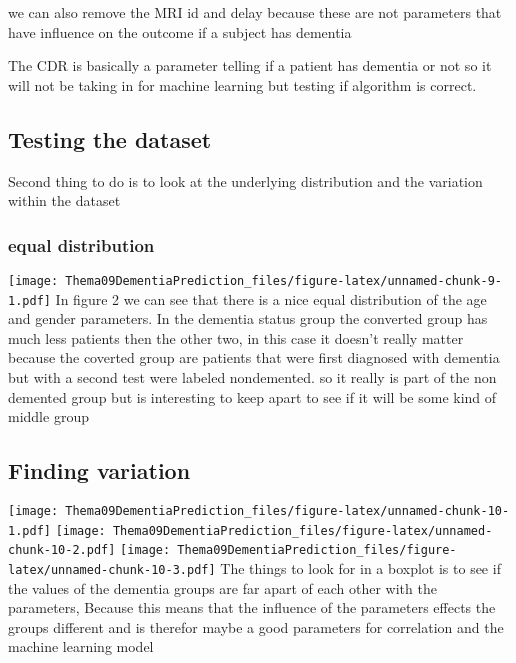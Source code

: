 \documentclass[
]{article}
\begin{document}
we can also remove the MRI id and delay because these are not parameters
that have influence on the outcome if a subject has dementia

The CDR is basically a parameter telling if a patient has dementia or
not so it will not be taking in for machine learning but testing if
algorithm is correct.

\hypertarget{testing-the-dataset}{%
\subsection{Testing the dataset}\label{testing-the-dataset}}

Second thing to do is to look at the underlying distribution and the
variation within the dataset

\hypertarget{equal-distribution}{%
\subsubsection{equal distribution}\label{equal-distribution}}

\texttt{[image: Thema09DementiaPrediction\_files/figure-latex/unnamed-chunk-9-1.pdf]}
In figure 2 we can see that there is a nice equal distribution of the
age and gender parameters. In the dementia status group the converted
group has much less patients then the other two, in this case it doesn't
really matter because the coverted group are patients that were first
diagnosed with dementia but with a second test were labeled nondemented.
so it really is part of the non demented group but is interesting to
keep apart to see if it will be some kind of middle group

\hypertarget{finding-variation}{%
\subsection{Finding variation}\label{finding-variation}}

\texttt{[image: Thema09DementiaPrediction\_files/figure-latex/unnamed-chunk-10-1.pdf]}
\texttt{[image: Thema09DementiaPrediction\_files/figure-latex/unnamed-chunk-10-2.pdf]}
\texttt{[image: Thema09DementiaPrediction\_files/figure-latex/unnamed-chunk-10-3.pdf]}
The things to look for in a boxplot is to see if the values of the
dementia groups are far apart of each other with the parameters, Because
this means that the influence of the parameters effects the groups
different and is therefor maybe a good parameters for correlation and
the machine learning model
\end{document}
